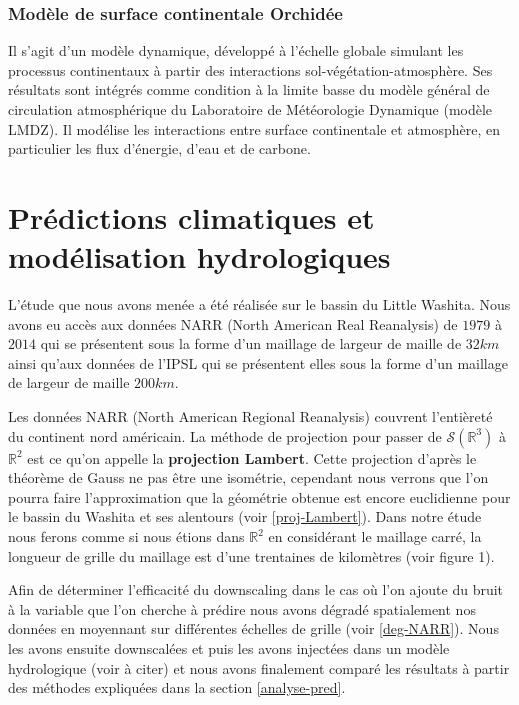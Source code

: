 \documentclass[a4paper,10pt]{article}
\begin{document}
\subsubsection{Modèle de surface continentale Orchidée}

Il s’agit d’un modèle dynamique, développé à l’échelle globale simulant les processus continentaux à partir des interactions sol-végétation-atmosphère. Ses résultats sont intégrés comme condition à la limite basse du modèle général de circulation atmosphérique du Laboratoire de Météorologie Dynamique (modèle LMDZ). Il modélise les interactions entre surface continentale et atmosphère, en particulier les flux d'énergie, d'eau et de carbone.


\section{Prédictions climatiques et modélisation hydrologiques}
\label{ch-pred-cli}
L'étude que nous avons menée a été réalisée sur le bassin du Little Washita. Nous avons eu accès aux données NARR (North American Real Reanalysis) de $1979$ à $2014$ qui se présentent sous la forme d'un maillage de largeur de maille de $32 km$ ainsi qu'aux données de l'IPSL qui se présentent elles sous la forme d'un maillage de largeur de maille $200 km$.

Les données NARR (North American Regional Reanalysis) couvrent l'entièreté du continent nord américain. La méthode de projection pour passer de $\mathcal{S}(\mathbb{R}^3)$ à $\mathbb{R}^2$ est ce qu'on appelle la \textbf{projection Lambert}. Cette projection d'après le théorème de Gauss ne pas être une isométrie, cependant nous verrons que l'on pourra faire l'approximation que la géométrie obtenue est encore euclidienne pour le bassin du Washita et ses alentours (voir \ref{proj-Lambert}). Dans notre étude nous ferons comme si nous étions dans $\mathbb{R}^2$ en considérant le maillage carré, la longueur de grille du maillage est d'une trentaines de kilomètres (voir figure 1).


Afin de déterminer l'efficacité du downscaling dans le cas où l'on ajoute du bruit à la variable que l'on cherche à prédire nous avons dégradé spatialement nos données en moyennant sur différentes échelles de grille (voir \ref{deg-NARR}).
Nous les avons ensuite downscalées et puis les avons injectées dans un modèle hydrologique (voir à citer) et nous avons finalement comparé les résultats à partir des méthodes expliquées dans la section \ref{analyse-pred}.
\end{document}
